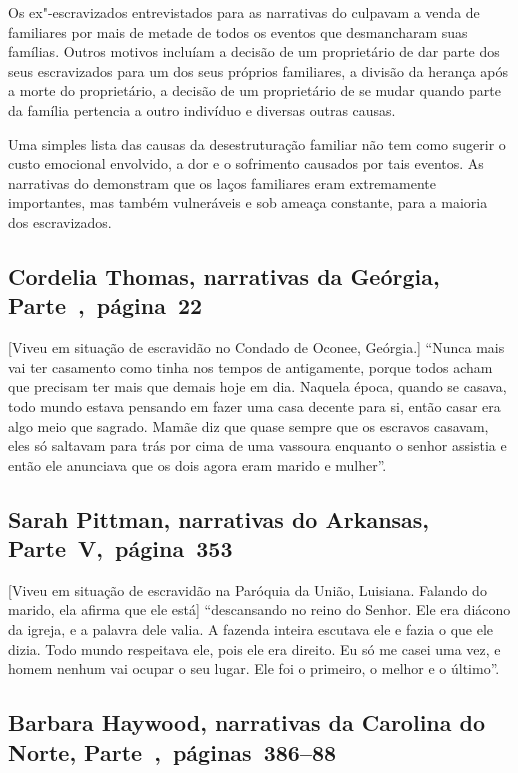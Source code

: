 {Os ex"-escravizados entrevistados para as narrativas do  culpavam a
venda de familiares por mais de metade de todos os eventos que
desmancharam suas famílias. Outros motivos incluíam a decisão de um
proprietário de dar parte dos seus escravizados para um dos seus próprios
familiares, a divisão da herança após a morte do proprietário, a decisão
de um proprietário de se mudar quando parte da família pertencia a outro
indivíduo e diversas outras causas.

Uma simples lista das causas da desestruturação familiar não tem
como sugerir o custo emocional envolvido, a dor e o sofrimento causados
por tais eventos. As narrativas do  demonstram que os laços
familiares eram extremamente importantes, mas também vulneráveis e sob
ameaça constante, para a maioria dos escravizados.
}

\subsection{Cordelia Thomas, narrativas da Geórgia, Parte~,~página~22}

{[}Viveu em situação de escravidão no Condado de Oconee, Geórgia.{]} ``Nunca mais vai ter casamento como tinha nos tempos de antigamente,
porque todos acham que precisam ter mais que demais hoje em dia. Naquela
época, quando se casava, todo mundo estava pensando em fazer uma casa
decente para si, então casar era algo meio que sagrado. Mamãe diz que
quase sempre que os escravos casavam, eles só saltavam para trás por
cima de uma vassoura enquanto o senhor assistia e então ele anunciava
que os dois agora eram marido e mulher''.

\subsection{Sarah Pittman, narrativas do Arkansas, Parte~V,~página~353}

{[}Viveu em situação de escravidão na Paróquia da União, Luisiana. Falando do marido, ela afirma que ele está{]} ``descansando no reino
do Senhor. Ele era diácono da igreja, e a palavra dele valia. A fazenda
inteira escutava ele e fazia o que ele dizia. Todo mundo respeitava ele,
pois ele era direito. Eu só me casei uma vez, e homem nenhum vai ocupar
o seu lugar. Ele foi o primeiro, o melhor e o último''.

\subsection{Barbara Haywood, narrativas da Carolina do Norte, Parte~,~páginas~386--88}
\label{ref131}

